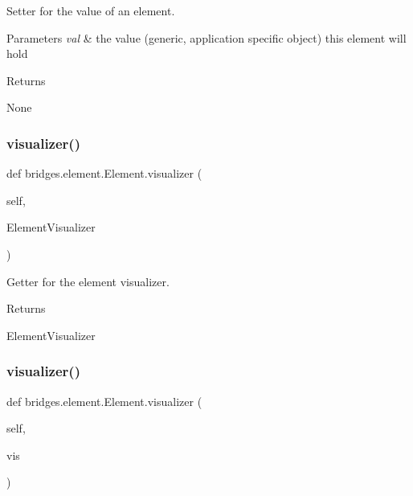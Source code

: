 Setter for the value of an element. 


\begin{DoxyParams}{Parameters}
{\em val} & the value (generic, application specific object) this element will hold \\
\hline
\end{DoxyParams}
\begin{DoxyReturn}{Returns}


None 
\end{DoxyReturn}
\mbox{\label{classbridges_1_1element_1_1_element_a727ec3cb97aeb68fec4cb456535f6763}} 
\subsubsection{\texorpdfstring{visualizer()}{visualizer()}\hspace{0.1cm}{\footnotesize\ttfamily [1/2]}}
{\footnotesize\ttfamily def bridges.\+element.\+Element.\+visualizer (\begin{DoxyParamCaption}\item[{}]{self,  }\item[{}]{Element\+Visualizer }\end{DoxyParamCaption})}



Getter for the element visualizer. 

\begin{DoxyReturn}{Returns}


Element\+Visualizer 
\end{DoxyReturn}
\mbox{\label{classbridges_1_1element_1_1_element_a38aad89ce4b1e01cb9f548cac4313077}} 
\subsubsection{\texorpdfstring{visualizer()}{visualizer()}\hspace{0.1cm}{\footnotesize\ttfamily [2/2]}}
{\footnotesize\ttfamily def bridges.\+element.\+Element.\+visualizer (\begin{DoxyParamCaption}\item[{}]{self,  }\item[{}]{vis }\end{DoxyParamCaption})}



